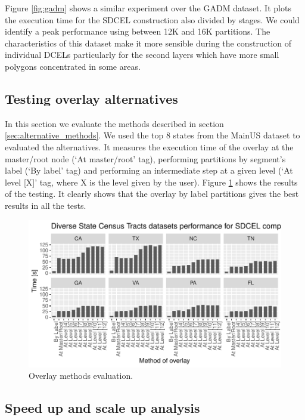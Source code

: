 Figure \ref{fig:gadm} shows a similar experiment over the GADM dataset.  It plots the execution time for the SDCEL construction also divided by stages. We could identify a peak performance using between 12K and 16K partitions.  The characteristics of this dataset make it more sensible during the construction of individual DCELs particularly for the second layers which have more small polygons concentrated in some areas.

\subsection{Testing overlay alternatives}
In this section we evaluate the methods described in section \ref{sec:alternative_methods}.  We used the top 8 states from the MainUS dataset to evaluated the alternatives.  It measures the execution time of the overlay at the master/root node (`At master/root' tag), performing partitions by segment's label (`By label' tag) and performing an intermediate step at a given level (`At level [X]' tag, where X is the level given by the user).  Figure \ref{fig:overlay_tester} shows the results of the testing.  It clearly shows that the overlay by label partitions gives the best results in all the tests.

\begin{figure}[!ht]
    \centering
    \includegraphics[width=\linewidth]{figures/experiments/Overlay_Tester/Overlay_Tester}
    \caption{Overlay methods evaluation.}\label{fig:overlay_tester}
\end{figure}


\subsection{Speed up and scale up analysis}

